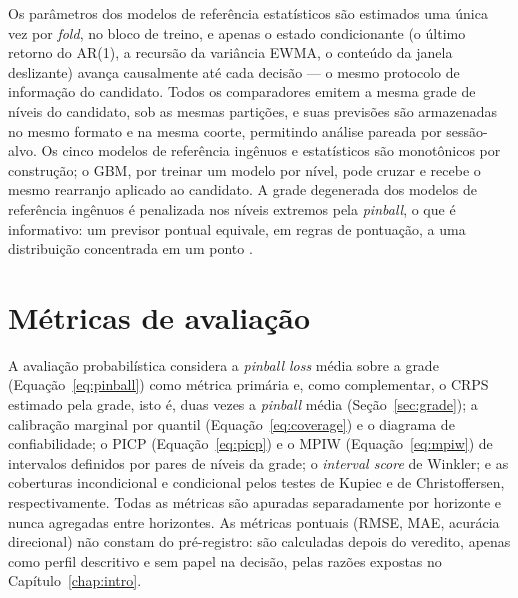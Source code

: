 Os parâmetros dos modelos de referência estatísticos são estimados uma única vez por \textit{fold}, no bloco de treino, e apenas o estado condicionante (o último retorno do AR(1), a recursão da variância EWMA, o conteúdo da janela deslizante) avança causalmente até cada decisão --- o mesmo protocolo de informação do candidato. Todos os comparadores emitem a mesma grade de níveis do candidato, sob as mesmas partições, e suas previsões são armazenadas no mesmo formato e na mesma coorte, permitindo análise pareada por sessão-alvo. Os cinco modelos de referência ingênuos e estatísticos são monotônicos por construção; o GBM, por treinar um modelo por nível, pode cruzar e recebe o mesmo rearranjo aplicado ao candidato. A grade degenerada dos modelos de referência ingênuos é penalizada nos níveis extremos pela \textit{pinball}, o que é informativo: um previsor pontual equivale, em regras de pontuação, a uma distribuição concentrada em um ponto \cite{GNEITING2007}.

\section{Métricas de avaliação} \label{sec:metricas}
A avaliação probabilística considera a \textit{pinball loss} média sobre a grade (Equação~\ref{eq:pinball}) como métrica primária e, como complementar, o CRPS estimado pela grade, isto é, duas vezes a \textit{pinball} média (Seção~\ref{sec:grade}); a calibração marginal por quantil (Equação~\ref{eq:coverage}) e o diagrama de confiabilidade; o PICP (Equação~\ref{eq:picp}) e o MPIW (Equação~\ref{eq:mpiw}) de intervalos definidos por pares de níveis da grade; o \textit{interval score} de Winkler; e as coberturas incondicional e condicional pelos testes de Kupiec e de Christoffersen, respectivamente. Todas as métricas são apuradas separadamente por horizonte e nunca agregadas entre horizontes. As métricas pontuais (RMSE, MAE, acurácia direcional) não constam do pré-registro: são calculadas depois do veredito, apenas como perfil descritivo e sem papel na decisão, pelas razões expostas no Capítulo~\ref{chap:intro}.

